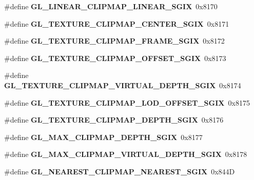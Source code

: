 \begin{DoxyCompactItemize}
\item 
\#define {\bfseries G\+L\+\_\+\+L\+I\+N\+E\+A\+R\+\_\+\+C\+L\+I\+P\+M\+A\+P\+\_\+\+L\+I\+N\+E\+A\+R\+\_\+\+S\+G\+I\+X}~0x8170\label{_s_d_l__opengl_8h_a28d7d458df31c82f1b1f5cb64e3e5aa6}

\item 
\#define {\bfseries G\+L\+\_\+\+T\+E\+X\+T\+U\+R\+E\+\_\+\+C\+L\+I\+P\+M\+A\+P\+\_\+\+C\+E\+N\+T\+E\+R\+\_\+\+S\+G\+I\+X}~0x8171\label{_s_d_l__opengl_8h_a7a42ed219e547e1c7d413fa79e6c57b6}

\item 
\#define {\bfseries G\+L\+\_\+\+T\+E\+X\+T\+U\+R\+E\+\_\+\+C\+L\+I\+P\+M\+A\+P\+\_\+\+F\+R\+A\+M\+E\+\_\+\+S\+G\+I\+X}~0x8172\label{_s_d_l__opengl_8h_a726ab65dc21404f7b54eac404ab91877}

\item 
\#define {\bfseries G\+L\+\_\+\+T\+E\+X\+T\+U\+R\+E\+\_\+\+C\+L\+I\+P\+M\+A\+P\+\_\+\+O\+F\+F\+S\+E\+T\+\_\+\+S\+G\+I\+X}~0x8173\label{_s_d_l__opengl_8h_a446e23d55c4eef6198c4c2da2502b3ec}

\item 
\#define {\bfseries G\+L\+\_\+\+T\+E\+X\+T\+U\+R\+E\+\_\+\+C\+L\+I\+P\+M\+A\+P\+\_\+\+V\+I\+R\+T\+U\+A\+L\+\_\+\+D\+E\+P\+T\+H\+\_\+\+S\+G\+I\+X}~0x8174\label{_s_d_l__opengl_8h_a1d035f11393bb4572dc8dcbf613e25f9}

\item 
\#define {\bfseries G\+L\+\_\+\+T\+E\+X\+T\+U\+R\+E\+\_\+\+C\+L\+I\+P\+M\+A\+P\+\_\+\+L\+O\+D\+\_\+\+O\+F\+F\+S\+E\+T\+\_\+\+S\+G\+I\+X}~0x8175\label{_s_d_l__opengl_8h_add981206c10f7da21c6a71d9648ea993}

\item 
\#define {\bfseries G\+L\+\_\+\+T\+E\+X\+T\+U\+R\+E\+\_\+\+C\+L\+I\+P\+M\+A\+P\+\_\+\+D\+E\+P\+T\+H\+\_\+\+S\+G\+I\+X}~0x8176\label{_s_d_l__opengl_8h_a19dc5f6553de8fb960660340122e4d53}

\item 
\#define {\bfseries G\+L\+\_\+\+M\+A\+X\+\_\+\+C\+L\+I\+P\+M\+A\+P\+\_\+\+D\+E\+P\+T\+H\+\_\+\+S\+G\+I\+X}~0x8177\label{_s_d_l__opengl_8h_a80832eb83dc196ab91a09fa4156ba62b}

\item 
\#define {\bfseries G\+L\+\_\+\+M\+A\+X\+\_\+\+C\+L\+I\+P\+M\+A\+P\+\_\+\+V\+I\+R\+T\+U\+A\+L\+\_\+\+D\+E\+P\+T\+H\+\_\+\+S\+G\+I\+X}~0x8178\label{_s_d_l__opengl_8h_aa64a39a0be4098484d6b9bc7e11db577}

\item 
\#define {\bfseries G\+L\+\_\+\+N\+E\+A\+R\+E\+S\+T\+\_\+\+C\+L\+I\+P\+M\+A\+P\+\_\+\+N\+E\+A\+R\+E\+S\+T\+\_\+\+S\+G\+I\+X}~0x844\+D\label{_s_d_l__opengl_8h_aba9a9bb970c7d11cb0791e7f596aa2ed}


\end{DoxyCompactItemize}

